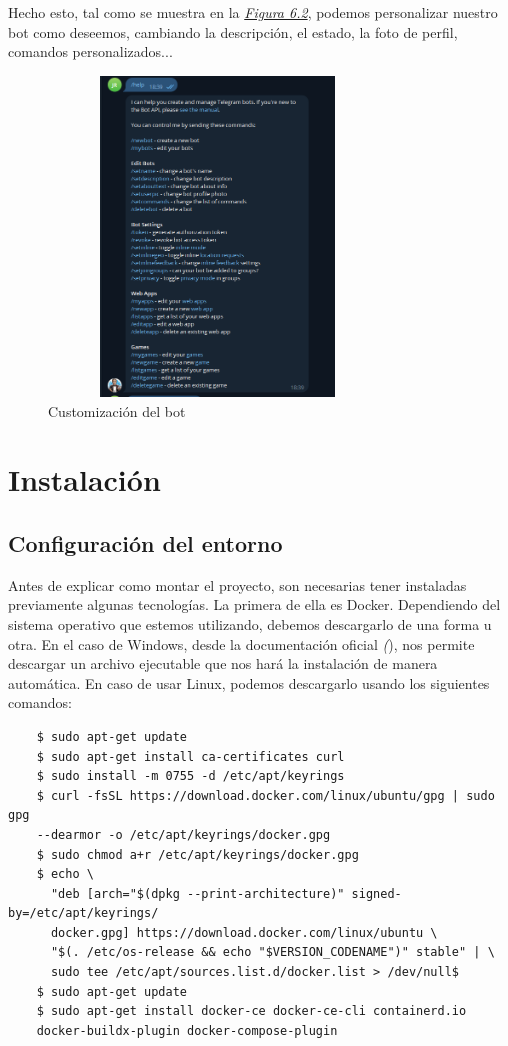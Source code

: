 Hecho esto, tal como se muestra en la \textit{\hyperref[fig:customize-bot]{Figura 6.2}}, podemos personalizar nuestro bot como deseemos, cambiando la descripción, el estado, la foto de perfil, comandos personalizados...

\begin{figure}[!ht]
    \centering
    \includegraphics[width=0.8\textwidth, height=8.5cm]{imagenes/bot_custom.png}
    \caption{ Customización del bot }
    \label{fig:customize-bot}
\end{figure}



\section{Instalación}

\subsection{Configuración del entorno}

Antes de explicar como montar el proyecto, son necesarias tener instaladas previamente algunas tecnologías.
La primera de ella es Docker. Dependiendo del sistema operativo que estemos utilizando, debemos descargarlo de una forma u otra. En el caso de Windows, desde la documentación oficial  \textit({\cite{docker})}, nos permite descargar un archivo ejecutable que nos hará la instalación de manera automática. En caso de usar Linux, podemos descargarlo usando los siguientes comandos:

\begin{verbatim}
    $ sudo apt-get update
    $ sudo apt-get install ca-certificates curl 
    $ sudo install -m 0755 -d /etc/apt/keyrings
    $ curl -fsSL https://download.docker.com/linux/ubuntu/gpg | sudo gpg 
    --dearmor -o /etc/apt/keyrings/docker.gpg
    $ sudo chmod a+r /etc/apt/keyrings/docker.gpg
    $ echo \
      "deb [arch="$(dpkg --print-architecture)" signed-by=/etc/apt/keyrings/
      docker.gpg] https://download.docker.com/linux/ubuntu \
      "$(. /etc/os-release && echo "$VERSION_CODENAME")" stable" | \
      sudo tee /etc/apt/sources.list.d/docker.list > /dev/null$
    $ sudo apt-get update
    $ sudo apt-get install docker-ce docker-ce-cli containerd.io 
    docker-buildx-plugin docker-compose-plugin
\end{verbatim}

